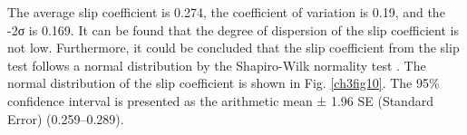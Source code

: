 \begin{table}[htbp]
\centering
\caption{Summary of the slip coefficient and estimation of variability}
\label{ch3tab1}
\end{table}

The average slip coefficient is 0.274, the coefficient of variation is 0.19, and the -2σ is 0.169. It can be found that the degree of dispersion of the slip coefficient is not low. Furthermore, it could be concluded that the slip coefficient from the slip test follows a normal distribution by the Shapiro-Wilk normality test \cite{shapiro1965Analysis}. The normal distribution of the slip coefficient is shown in Fig. \ref{ch3fig10}. The 95\% confidence interval is presented as the arithmetic mean ± 1.96 SE (Standard Error) (0.259--0.289).

